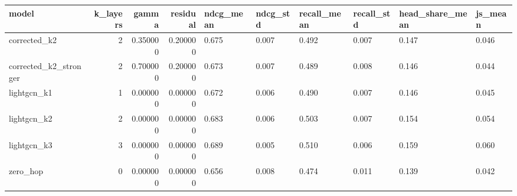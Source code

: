 \begin{tabular}{lrrrllllll}
\toprule
model & k_layers & gamma & residual & ndcg_mean & ndcg_std & recall_mean & recall_std & head_share_mean & js_mean \\
\midrule
corrected_k2 & 2 & 0.350000 & 0.200000 & 0.675 & 0.007 & 0.492 & 0.007 & 0.147 & 0.046 \\
corrected_k2_stronger & 2 & 0.700000 & 0.200000 & 0.673 & 0.007 & 0.489 & 0.008 & 0.146 & 0.044 \\
lightgcn_k1 & 1 & 0.000000 & 0.000000 & 0.672 & 0.006 & 0.490 & 0.007 & 0.146 & 0.045 \\
lightgcn_k2 & 2 & 0.000000 & 0.000000 & 0.683 & 0.006 & 0.503 & 0.007 & 0.154 & 0.054 \\
lightgcn_k3 & 3 & 0.000000 & 0.000000 & 0.689 & 0.005 & 0.510 & 0.006 & 0.159 & 0.060 \\
zero_hop & 0 & 0.000000 & 0.000000 & 0.656 & 0.008 & 0.474 & 0.011 & 0.139 & 0.042 \\
\bottomrule
\end{tabular}

